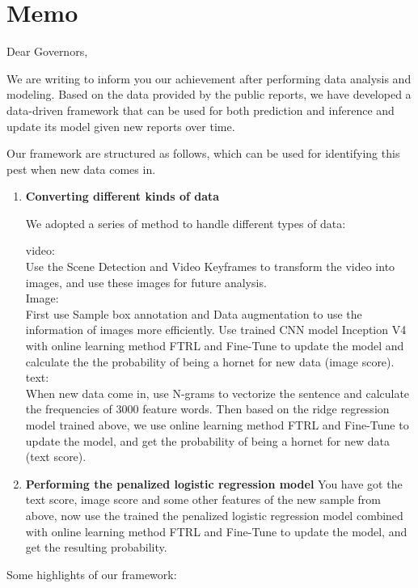 \documentclass[12pt]{article}
\begin{document}
\clearpage
\section*{Memo}
	\begin{flushleft}
		Dear Governors,
	\end{flushleft}
	
	We are writing to inform you our achievement after performing data analysis and modeling. Based on the data provided by the public reports, we have developed a data-driven framework that can be used for both prediction and inference and update its model given new reports over time.

	Our framework are structured as follows, which can be used for identifying this pest when new data comes in.
	\begin{enumerate}[\bf 1.]
		\item \textbf{Converting different kinds of data }
		
		We adopted a series of method to handle different types of data:
		
		video:\\
		Use the Scene Detection and Video Keyframes to transform the video into images, and use these images for future analysis.\\
		Image:\\
		First use Sample box annotation and Data augmentation to use the information of images more efficiently. Use trained CNN model Inception V4 with online learning method FTRL and Fine-Tune to update the model and calculate the the probability of being a hornet for new data (image score).
		text:\\
		When new data come in, use N-grams to vectorize the sentence and calculate the frequencies of 3000 feature words. Then based on the ridge regression model trained above, we use online learning method FTRL and Fine-Tune to update the model, and get the probability of being a hornet for new data (text score).
		\item \textbf{Performing the penalized logistic regression model}
		You have got the text score, image score and some other features of the new sample from above, now use the trained the penalized logistic regression model combined with online learning method FTRL and Fine-Tune to update the model, and get the resulting probability.
	\end{enumerate}
	Some highlights of our framework:
	
\end{document}
